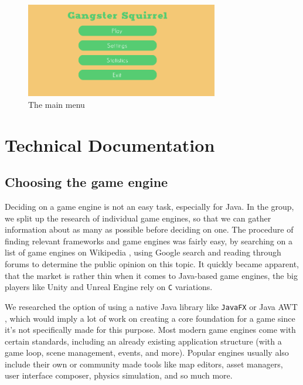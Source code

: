 \documentclass[12p]{article}
\begin{document}
\begin{figure}[ht]
 \center
 \includegraphics[width=0.75\textwidth]{Documentation/main_menu.png}
 \caption{The main menu}
 \label{fig:main_menu_screenshot}
\end{figure}


\clearpage
\section{Technical Documentation}

\subsection{Choosing the game engine} \label{DocGameEngine}

Deciding on a game engine is not an easy task, especially for Java. In the group, we split up the research of individual game engines, so that we can gather information about as many as possible before deciding on one. The procedure of finding relevant frameworks and game engines was fairly easy, by searching on a list of game engines on Wikipedia \cite{ListOfGameEngines}, using Google search and reading through forums to determine the public opinion on this topic. It quickly became apparent, that the market is rather thin when it comes to Java-based game engines, the big players like Unity \cite{UnityGameEngine} and Unreal Engine \cite{UnrealEngine} rely on \texttt{C} variations.

We researched the option of using a native Java library like \texttt{JavaFX} \cite{JavaFX} or Java AWT \cite{javaawt}, which would imply a lot of work on creating a core foundation for a game since it's not specifically made for this purpose. Most modern game engines come with certain standards, including an already existing application structure (with a game loop, scene management, events, and more). Popular engines usually also include their own or community made tools like map editors, asset managers, user interface composer, physics simulation, and so much more.
\end{document}
